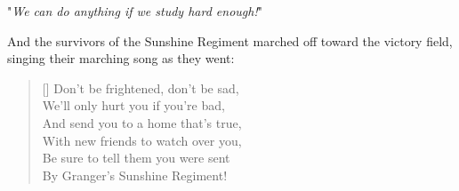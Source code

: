 "\emph{We can do anything if we study hard enough!}"

And the survivors of the Sunshine Regiment marched off toward the victory
field, singing their marching song as they went:

\begin{verse}[\versewidth]
Don't be frightened, don't be sad,\\
We'll only hurt you if you're bad,\\
And send you to a home that's true,\\
With new friends to watch over you,\\
Be sure to tell them you were sent\\
By Granger's Sunshine Regiment!
\end{verse}
